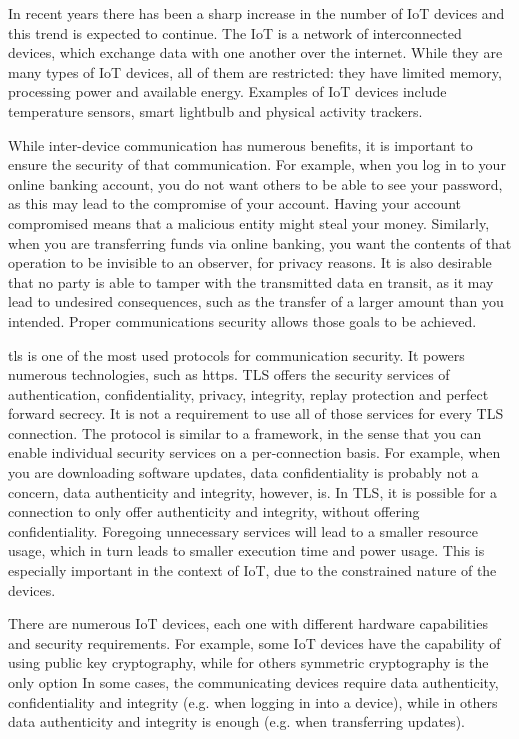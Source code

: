 \documentclass{llncs}
\begin{document}
In recent years there has been a sharp increase in the number of IoT
devices and this trend is expected to continue. The IoT is a network
of interconnected devices, which exchange data with one another over
the internet. While they are many types of IoT devices, all of them
are restricted: they have limited memory, processing power and
available energy. Examples of IoT devices include temperature sensors,
smart lightbulb and physical activity trackers.

While inter-device communication has numerous benefits, it is important
to ensure the security of that communication. For example, when you log
in to your online banking account, you do not want others to be
able to see your password, as this may lead to the compromise of your
account. Having your account compromised means that a malicious entity
might steal your money. Similarly, when you are transferring funds via
online banking, you want the contents of that operation to be
invisible to an observer, for privacy reasons. It is also desirable
that no party is able to tamper with the transmitted data en transit,
as it may lead to undesired consequences, such as the transfer of a
larger amount than you intended. Proper communications security allows
those goals to be achieved.

\gls{tls} is one of the most used protocols for communication security. It
powers numerous technologies, such as \gls{https}. TLS offers the
security services of authentication, confidentiality, privacy, integrity, replay
protection and perfect forward secrecy. It is not a requirement to use all of
those services for every TLS connection. The protocol is similar to
a framework, in the sense that you can enable individual security
services on a per-connection basis. For example, when you are downloading
software updates, data confidentiality is probably not a concern,
data authenticity and integrity, however, is. In TLS, it is possible for a connection
to only offer authenticity and integrity, without offering confidentiality.
Foregoing unnecessary services will lead to a smaller resource usage,
which in turn leads to smaller execution time and power usage. This
is especially important in the context of IoT, due to the constrained
nature of the devices.

There are numerous IoT devices, each one with different hardware
capabilities and security requirements. For example, some IoT
devices have the capability of using public key cryptography,
while for others symmetric cryptography is the only option
In some cases, the communicating devices require data authenticity, confidentiality
and integrity (e.g. when logging in into a device), while in others data
authenticity and integrity is enough (e.g. when transferring updates).
\end{document}
